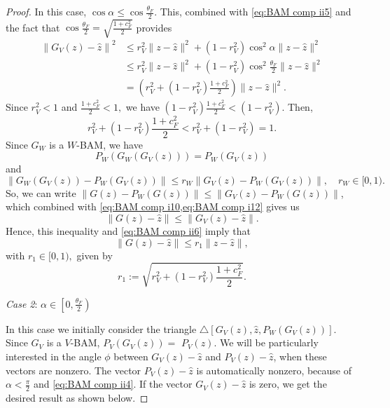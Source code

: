 \documentclass[smallextended,numbook,nospthms]{svjour3}
\theoremstyle{plain}
\theoremstyle{definition}
\begin{document}
\begin{proof}
	
	In this case, $\cos \alpha \leq \cos \frac{\theta_{F}}{2}$. This, combined with \cref{eq:BAM comp ii5} and the fact that $\cos \frac{\theta_{F}}{2}=\sqrt{\frac{1+c_{F}^{2}}{2}}$ provides
	\begin{align}
		\left\|G_{V}(z)-\hat{z}\right\|^{2} & \leq r_{V}^{2}\|z-\hat{z}\|^{2}+\left(1-r_{V}^{2}\right) \cos ^{2} \alpha\|z-\hat{z}\|^{2} \\
		& \leq r_{V}^{2}\|z-\hat{z}\|^{2}+\left(1-r_{V}^{2}\right) \cos ^{2} \frac{\theta_{F}}{2}\|z-\hat{z}\|^{2} \\
		&=\left(r_{V}^{2}+\left(1-r_{V}^{2}\right) \frac{1+c_{F}^{2}}{2}\right)\|z-\hat{z}\|^{2}. \label{eq:BAM comp ii6}
	\end{align}
	Since $r_{V}^{2}<1$ and $\frac{1+c_{F}^{2}}{2}<1,$ we have $\left(1-r_{V}^{2}\right) \frac{1+c_{F}^{2}}{2}<\left(1-r_{V}^{2}\right)$. Then,
	\begin{equation}
		r_{V}^{2}+\left(1-r_{V}^{2}\right) \frac{1+c_{F}^{2}}{2}<r_{V}^{2}+\left(1-r_{V}^{2}\right)=1. \label{eq:BAM comp ii7}
	\end{equation}
	Since $G_{W}$ is a $W$-BAM, we have \[
	P_{W}\left(G_{W}\left(G_{V}(z)\right)\right)=P_{W}\left(G_{V}(z)\right)\] and
	\[ \left\|G_{W}\left(G_{V}(z)\right)-P_{W}\left(G_{V}(z)\right)\right\| \leq r_{W} \| G_{V}(z)-P_{W}\left(G_{V}(z)\right) \|, \quad r_{W} \in[0,1).
	\]
	So, we can write $\left\|G(z)-P_{W}(G(z))\right\| \leq\left\|G_{V}(z)-P_{W}(G(z))\right\|$, which combined with \cref{eq:BAM comp i10,eq:BAM comp i12}
	gives us
	\begin{equation}
		\|G(z)-\hat{z}\| \leq\left\|G_{V}(z)-\hat{z}\right\| \label{eq:BAM comp ii8}.
	\end{equation}
	Hence, this inequality and \cref{eq:BAM comp ii6} imply that
	\begin{equation}
	\|G(z)-\hat{z}\| \leq r_{1}\|z-\hat{z}\|, \label{eq:BAM comp ii9}
	\end{equation}
	with $r_{1} \in[0,1),$ given by
	\begin{equation}
	r_{1}:=\sqrt{r_{V}^{2}+\left(1-r_{V}^{2}\right) \frac{1+c_{F}^{2}}{2}}. \label{eq:BAM comp ii10}
	\end{equation}

	\emph{Case 2}: $\alpha \in\left[0, \frac{\theta_{F}}{2}\right)$
	
	In this case we initially consider the triangle $\triangle[G_{V}(z), \hat{z},P_{W}\left(G_{V}(z)\right)]$. Since $G_{V}$ is a $V$-BAM, $P_{V}\left(G_{V}(z)\right)=$ $P_{V}(z)$. We will be particularly interested in the angle $\phi$ between $G_{V}(z)-\hat{z}$ and $P_{V}(z)-\hat{z}$, when these vectors are nonzero. The vector $P_{V}(z)-\hat{z}$ is automatically nonzero, because of $\alpha<\frac{\pi}{2}$ and \cref{eq:BAM comp ii4}. If the vector $G_{V}(z)-\hat{z}$ is zero, we get the desired result as shown below.
	

\end{proof}
\end{document}
